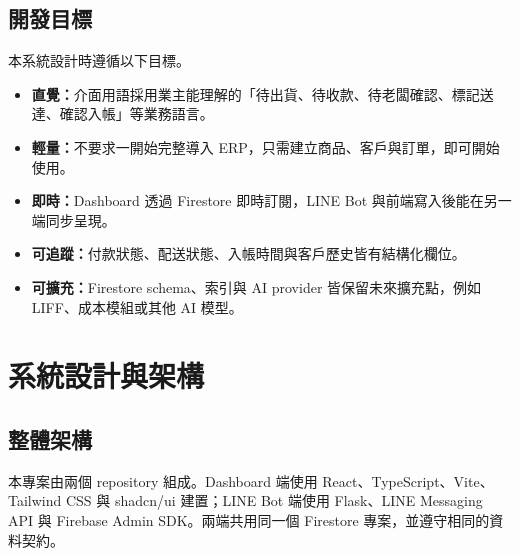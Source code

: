 \documentclass[12pt,a4paper,UTF8,fontset=none]{ctexart}
\begin{document}
\subsection{開發目標}

本系統設計時遵循以下目標。

\begin{itemize}
  \item \textbf{直覺：}介面用語採用業主能理解的「待出貨、待收款、待老闆確認、標記送達、確認入帳」等業務語言。
  \item \textbf{輕量：}不要求一開始完整導入 ERP，只需建立商品、客戶與訂單，即可開始使用。
  \item \textbf{即時：}Dashboard 透過 Firestore 即時訂閱，LINE Bot 與前端寫入後能在另一端同步呈現。
  \item \textbf{可追蹤：}付款狀態、配送狀態、入帳時間與客戶歷史皆有結構化欄位。
  \item \textbf{可擴充：}Firestore schema、索引與 AI provider 皆保留未來擴充點，例如 LIFF、成本模組或其他 AI 模型。
\end{itemize}

\section{系統設計與架構}

\subsection{整體架構}

本專案由兩個 repository 組成。Dashboard 端使用 React、TypeScript、Vite、Tailwind CSS 與 shadcn/ui 建置；LINE Bot 端使用 Flask、LINE Messaging API 與 Firebase Admin SDK。兩端共用同一個 Firestore 專案，並遵守相同的資料契約。
\end{document}
